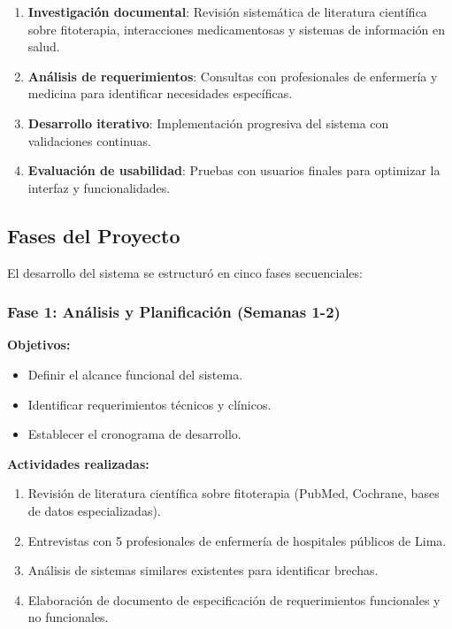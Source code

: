 \documentclass[12pt,a4paper]{article}
\begin{document}
\begin{enumerate}
    \item \textbf{Investigación documental}: Revisión sistemática de literatura científica sobre fitoterapia, interacciones medicamentosas y sistemas de información en salud.
    \item \textbf{Análisis de requerimientos}: Consultas con profesionales de enfermería y medicina para identificar necesidades específicas.
    \item \textbf{Desarrollo iterativo}: Implementación progresiva del sistema con validaciones continuas.
    \item \textbf{Evaluación de usabilidad}: Pruebas con usuarios finales para optimizar la interfaz y funcionalidades.
\end{enumerate}

\subsection{Fases del Proyecto}

El desarrollo del sistema se estructuró en cinco fases secuenciales:

\subsubsection{Fase 1: Análisis y Planificación (Semanas 1-2)}

\textbf{Objetivos:}
\begin{itemize}
    \item Definir el alcance funcional del sistema.
    \item Identificar requerimientos técnicos y clínicos.
    \item Establecer el cronograma de desarrollo.
\end{itemize}

\textbf{Actividades realizadas:}
\begin{enumerate}
    \item Revisión de literatura científica sobre fitoterapia (PubMed, Cochrane, bases de datos especializadas).
    \item Entrevistas con 5 profesionales de enfermería de hospitales públicos de Lima.
    \item Análisis de sistemas similares existentes para identificar brechas.
    \item Elaboración de documento de especificación de requerimientos funcionales y no funcionales.
\end{enumerate}
\end{document}
